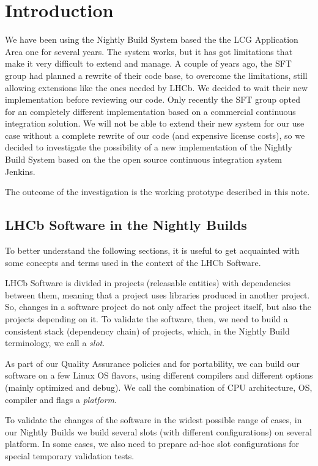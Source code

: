 
\section{Introduction}
\label{sec:Introduction}

We have been using the Nightly Build System based the the LCG Application Area
one for several years\cite{Kruzelecki:2010zz}.  The system works, but it has got
limitations that make it very difficult to extend and manage.  A couple of years
ago, the SFT group had planned a rewrite of their code base, to overcome the
limitations, still allowing extensions like the ones needed by LHCb.  We decided to
wait their new implementation before reviewing our code.  Only recently the SFT
group opted for an completely different implementation based on a commercial
continuous integration solution.  We will not be able to extend their new system
for our use case without a complete rewrite of our code (and expensive license
costs), so we decided to investigate the possibility of a new implementation of
the Nightly Build System based on the the open source continuous integration
system Jenkins\cite{Jenkins}.

The outcome of the investigation is the working prototype described in this
note.

\subsection{LHCb Software in the Nightly Builds}
To better understand the following sections, it is useful to get acquainted with
some concepts and terms used in the context of the LHCb Software.

LHCb Software is divided in projects (releasable entities) with dependencies
between them, meaning that a project uses libraries produced in another project.
So, changes in a software project do not only affect the project itself, but
also the projects depending on it.  To validate the software, then, we need to
build a consistent stack (dependency chain) of projects, which, in the Nightly
Build terminology, we call a \emph{slot}.

As part of our Quality Assurance policies and for portability, we can build our
software on a few Linux OS flavors, using different compilers and different
options (mainly optimized and debug).  We call the combination of CPU
architecture, OS, compiler and flags a \emph{platform}.

To validate the changes of the software in the widest possible range of cases,
in our Nightly Builds we build several slots (with different configurations) on
several platform.  In some cases, we also need to prepare ad-hoc slot
configurations for special temporary validation tests.
